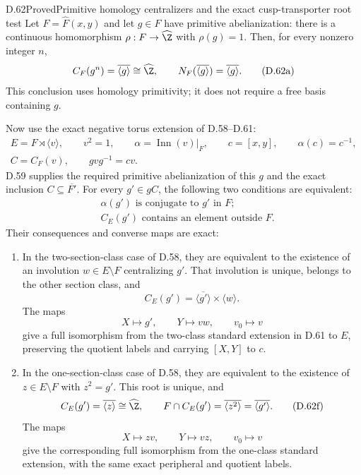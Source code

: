\begin{claim}{D.62}{Proved}{Primitive homology centralizers and the exact cusp-transporter root test}
Let $F=\widehat F(x,y)$ and let $g\in F$ have primitive
abelianization: there is a continuous homomorphism
$\rho:F\to\widehat\Z$ with $\rho(g)=1$.
Then, for every nonzero integer $n$,
\[
 C_F(g^n)=\overline{\langle g\rangle}\cong\widehat\Z,
 \qquad
 N_F(\overline{\langle g\rangle})
                  =\overline{\langle g\rangle}.
                                                        \tag{D.62a}
\]
This conclusion uses homology primitivity; it does not
require a free basis containing $g$.

Now use the exact negative torus extension of
D.58--D.61:
\[
 \begin{gathered}
 E=F\rtimes\langle v\rangle,\qquad v^2=1,\qquad
 \alpha=\operatorname{Inn}(v)|_F,\qquad
 c=[x,y],\qquad \alpha(c)=c^{-1},\\
 C=C_F(v),\qquad gvg^{-1}=cv.
 \end{gathered}                                         \tag{D.62b}
\]
D.59 supplies the required primitive abelianization of
this $g$ and the exact inclusion $C\subseteq\overline{F'}$.
For every $g'\in gC$, the following two conditions
are equivalent:
\[
 \begin{split}
 &\alpha(g')\text{ is conjugate to }g'\text{ in }F;\\
 &C_E(g')\text{ contains an element outside }F.
 \end{split}                                           \tag{D.62c}
\]
Their consequences and converse maps are exact:

\begin{enumerate}
\item
In the two-section-class case of D.58,
they are equivalent to the existence of an involution
$w\in E\setminus F$ centralizing $g'$.
That involution is unique, belongs to the other
section class, and
\[
 C_E(g')=\overline{\langle g'\rangle}\times\langle w\rangle.
                                                        \tag{D.62d}
\]
The maps
\[
 X\longmapsto g',\qquad Y\longmapsto vw,\qquad
 v_0\longmapsto v
                                                        \tag{D.62e}
\]
give a full isomorphism from the two-class standard
extension in D.61 to $E$, preserving the quotient labels
and carrying $[X,Y]$ to $c$.

\item
In the one-section-class case of D.58,
they are equivalent to the existence of $z\in E\setminus F$
with $z^2=g'$.
This root is unique, and
\[
 C_E(g')=\overline{\langle z\rangle}\cong\widehat\Z,
 \qquad
 F\cap C_E(g')=\overline{\langle z^2\rangle}
                         =\overline{\langle g'\rangle}.
                                                        \tag{D.62f}
\]
The maps
\[
 X\longmapsto zv,\qquad Y\longmapsto vz,\qquad
 v_0\longmapsto v
                                                        \tag{D.62g}
\]
give the corresponding full isomorphism from the
one-class standard extension, with the same exact
peripheral and quotient labels.
\end{enumerate}


\end{claim}
